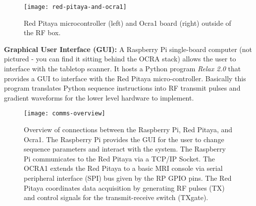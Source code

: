 \begin{figure}[h]
    \centering
    \texttt{[image: red-pitaya-and-ocra1]}
    \caption{\label{fig:console-boards} Red Pitaya microcontroller (left) and Ocra1 board (right) outside of the RF box.}
    \vspace{-5mm}
\end{figure}

\vspace{5mm} 

\noindent\textbf{Graphical User Interface (GUI):} A Raspberry Pi single-board computer (not pictured - you can find it sitting behind the OCRA stack) allows the user to interface with the tabletop scanner. It hosts a Python program \emph{Relax 2.0} that provides a GUI to interface with the Red Pitaya micro-controller. Basically this program translates Python sequence instructions into RF transmit pulses and gradient waveforms for the lower level hardware to implement.

\begin{figure}[h]
    \centering
    \texttt{[image: comms-overview]}
    \captionsetup{width=.9\textwidth}
    \caption{\label{fig:comms-overview} Overview of connections between the Raspberry Pi, Red Pitaya, and Ocra1. The Raspberry Pi provides the GUI for the user to change sequence parameters and interact with the system. The Raspberry Pi communicates to the Red Pitaya via a TCP/IP Socket. The OCRA1 extends the Red Pitaya to a basic MRI console via serial peripheral interface (SPI) bus given by the RP GPIO pins. The Red Pitaya coordinates data acquisition by generating RF pulses (TX) and control signals for the transmit-receive switch (TXgate).}
    \vspace{-5mm}
\end{figure}
